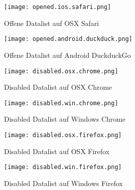 \begin{figure}[!htb]
    \centering
    \begin{minipage}[b]{0.45\textwidth}
        \centering
        \texttt{[image: opened.ios.safari.png]}
        \caption{Offene Datalist auf OSX Safari}
        \label{img:openedIosSafariDatalist}
    \end{minipage}
    \hfill
    \begin{minipage}[b]{0.45\textwidth}
        \centering
        \texttt{[image: opened.android.duckduck.png]}
        \caption{Offene Datalist auf Android DuckduckGo}
        \label{img:openedAndroidDuckduckDatalist}
    \end{minipage}
\end{figure}


\begin{figure}[!htb]
    \centering
    \begin{minipage}[b]{0.45\textwidth}
        \centering
        \texttt{[image: disabled.osx.chrome.png]}
        \caption{Disabled Datalist auf OSX Chrome}
        \label{img:disabledOsxChromeDatalist}
    \end{minipage}
    \hfill
    \begin{minipage}[b]{0.45\textwidth}
        \centering
        \texttt{[image: disabled.win.chrome.png]}
        \caption{Disabled Datalist auf Windows Chrome}
        \label{img:disabledWinChromeDatalist}
    \end{minipage}
\end{figure}

\begin{figure}[!htb]
    \centering
    \begin{minipage}[b]{0.45\textwidth}
        \centering
        \texttt{[image: disabled.osx.firefox.png]}
        \caption{Disabled Datalist auf OSX Firefox}
        \label{img:disabledOsxFirefoxDatalist}
    \end{minipage}
    \hfill
    \begin{minipage}[b]{0.45\textwidth}
        \centering
        \texttt{[image: disabled.win.firefox.png]}
        \caption{Disabled Datalist auf Windows Firefox}
        \label{img:disabledWinFirefoxDatalist}
    \end{minipage}
\end{figure}

